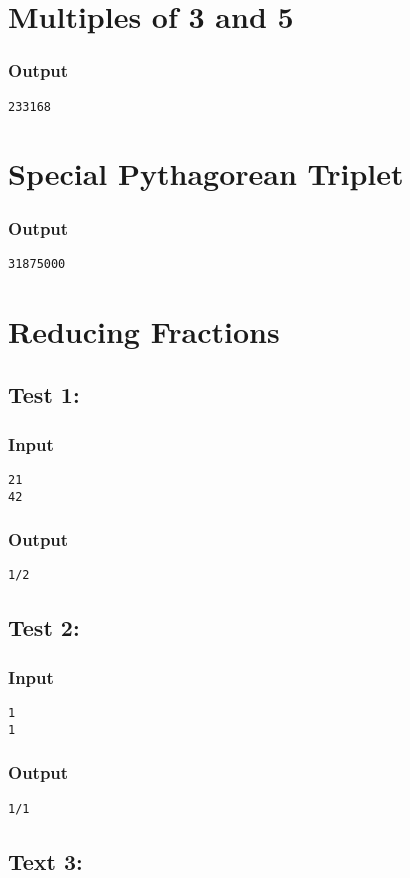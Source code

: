 \documentclass[twocolumn]{extarticle}
\begin{document}
\section{Multiples of 3 and 5}
\subsubsection*{Output}
\texttt{233168}

\section{Special Pythagorean Triplet}
\subsubsection*{Output}
\texttt{31875000}

\section{Reducing Fractions}
\subsection*{Test 1:}
\subsubsection*{Input}
\texttt{21\\42}

\subsubsection*{Output}
\texttt{1/2}

\subsection*{Test 2:}
\subsubsection*{Input}
\texttt{1\\1}

\subsubsection*{Output}
\texttt{1/1}

\subsection*{Text 3:}
\end{document}
